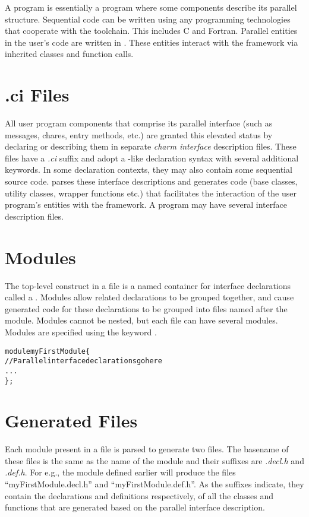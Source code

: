 A \charm program is essentially a \CC program where some components describe
its parallel structure. Sequential code can be written using any programming
technologies that cooperate with the \CC toolchain. This includes C and
Fortran. Parallel entities in the user's code are written in \CC{}. These
entities interact with the \charm framework via inherited classes and function
calls.


\section{.ci Files}
All user program components that comprise its parallel interface (such as
messages, chares, entry methods, etc.) are granted this elevated status by
declaring or describing them in separate \emph{charm interface} description
files. These files have a \emph{.ci} suffix and adopt a \CC-like declaration
syntax with several additional keywords. In some declaration contexts, they
may also contain some sequential \CC source code.
\charm parses these interface descriptions and generates \CC code (base
classes, utility classes, wrapper functions etc.) that facilitates the
interaction of the user program's entities with the framework.  A program may
have several interface description files.


\section{Modules}
The top-level construct in a \ci file is a named container for interface
declarations called a . Modules allow related declarations to be
grouped together, and cause generated code for these declarations to be grouped
into files named after the module. Modules cannot be nested, but each \ci file
can have several modules. Modules are specified using the keyword .

\begin{alltt}
module myFirstModule \{
    // Parallel interface declarations go here
    ...
\};
\end{alltt}


\section{Generated Files}

Each module present in a \ci file is parsed to generate two files. The basename
of these files is the same as the name of the module and their suffixes are
\emph{.decl.h} and \emph{.def.h}. For e.g., the module defined earlier will
produce the files ``myFirstModule.decl.h'' and ``myFirstModule.def.h''. As the
suffixes indicate, they contain the declarations and definitions respectively,
of all the classes and functions that are generated based on the parallel
interface description.

